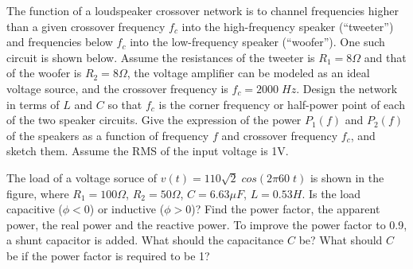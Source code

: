 \item The function of a loudspeaker crossover network is to channel 
frequencies higher than a given crossover frequency $f_c$ into the
high-frequency speaker (``tweeter'') and frequencies below $f_c$ into
the low-frequency speaker (``woofer''). One such circuit is shown below.
Assume the resistances of the tweeter is $R_1=8\Omega$ and that of the 
woofer is $R_2=8\Omega$, the voltage amplifier can be modeled as an
ideal voltage source, and the crossover frequency is $f_c=2000\; Hz$.
Design the network in terms of $L$ and $C$ so that $f_c$ is the corner
frequency or half-power point of each of the two speaker circuits. Give 
the expression of the power $P_1(f)$ and $P_2(f)$ of the speakers as a 
function of frequency $f$ and crossover frequency $f_c$, and sketch them.
Assume the RMS of the input voltage is 1V.


% 





\item The load of a voltage soruce of $v(t)=110\sqrt{2} \;cos(2\pi 60\;t)$
is shown in the figure, where $R_1=100\Omega$, $R_2=50\Omega$, $C=6.63\mu F$, 
$L=0.53 H$. Is the load capacitive ($\phi<0$) or inductive ($\phi>0$)?
Find the power factor, the apparent power, the real power and the
reactive power. To improve the power factor to 0.9, a shunt capacitor is added.
What should the capacitance $C$ be? What should $C$ be if the power factor is 
required to be 1?


